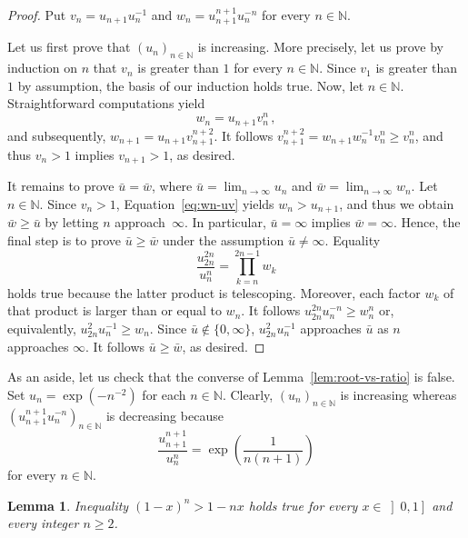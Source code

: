 \documentclass[12pt]{article}
\newcommand{\bN}{\mathbb{N}} %
\newtheorem{lemma}{Lemma}
\begin{document}
\begin{proof}
 Put
  $v_n = u_{n + 1} u_n^{-1}$
  and
  $w_n = u_{n + 1}^{n + 1} u_n^{- n}$
  for every $n \in \bN$.
  
  Let us first prove that $\left( u_n \right)_{n \in \bN}$ is increasing.
  More precisely, let us prove by induction on $n$ that $v_n$ is greater than $1$ for every $n \in \bN$.
  Since $v_1$ is greater than $1$ by assumption,
  the basis of our induction holds true.
  Now, let $n \in \bN$. %
  Straightforward computations yield
  \begin{equation} \label{eq:wn-uv}
    w_n = u_{n + 1}v_n^n \,, 
  \end{equation} 
  and subsequently, 
  $w_{n + 1} = u_{n + 1} v_{n + 1}^{n + 2}$.
  It follows  
  $v_{n + 1}^{n + 2}= w_{n + 1}w_n^{-1} v_n^n \ge v_n^n$,
  and thus $v_n > 1$ implies $v_{n + 1} > 1$, as desired.

  It remains to prove $\bar u = \bar w$, where 
  $\bar u = \lim_{n \to \infty} u_n$ and 
  $\bar w = \lim_{n \to \infty} w_n$.
  Let $n \in \bN$.
  Since $v_n > 1$,
  Equation~\eqref{eq:wn-uv} yields $w_n > u_{n + 1}$,
  and thus we obtain $\bar w \ge \bar u$ by letting $n$ approach~$\infty$.
  In particular, $\bar u = \infty$ implies $\bar w = \infty$.
  Hence, the final step is to prove $\bar u \ge \bar w$ under the assumption $\bar u \ne \infty$.
  Equality 
  $$
  \frac{u_{2n}^{2n}}{ u_n^n} =  \prod_{k = n}^{2n - 1} w_k
  $$
  holds true because the latter product is telescoping.
  Moreover, each factor $w_k$ of that product is larger than or equal to $w_n$.
  It follows 
  $u_{2n}^{2n} u_n^{-n} \ge w_n^n$ 
  or, equivalently,
  $u_{2n}^2u_n^{- 1}  \ge  w_n$.
  Since $\bar u \notin \{ 0, \infty \}$, 
  $u_{2n}^2 u_n^{-1}$ approaches $\bar u$ as $n$ approaches $\infty$.
  It follows $\bar u \ge \bar w$, as desired.
\end{proof}

As an aside, let us check that the converse of Lemma~\ref{lem:root-vs-ratio} is false.
Set $ u_n = \exp \left( - n^{- 2} \right)$ for each $n \in \bN$.
Clearly,  $\left( u_n \right)_{n \in \bN}$  is increasing whereas
$\left(  u_{n + 1}^{n + 1}  u_n^{-n} \right)_{n \in \bN}$ is decreasing because 
$$
\frac{u_{n + 1}^{n + 1}}{u_n^n} = \exp \left(\frac{1}{n (n + 1)} \right) 
$$
for every $n \in \bN$.

\begin{lemma} \label{lem:Bernoulli}
  Inequality ${(1 - x)}^n > 1 - n x $
  holds true for every $x \in \left]0, 1 \right]$ and every integer $n \ge 2$.
\end{lemma} 
\end{document}
